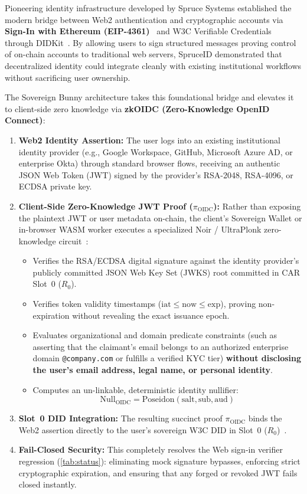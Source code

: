 \documentclass[a4paper,11pt,twoside,parskip=half-,headings=small]{scrartcl}
\newcommand{\code}[1]{\texttt{#1}}
\begin{document}
Pioneering identity infrastructure developed by Spruce Systems established the modern bridge between Web2 authentication and cryptographic accounts via \textbf{Sign-In with Ethereum (EIP-4361)}~\cite{spruceid2022siwe} and W3C Verifiable Credentials through DIDKit~\cite{dif2021did}. By allowing users to sign structured messages proving control of on-chain accounts to traditional web servers, SpruceID demonstrated that decentralized identity could integrate cleanly with existing institutional workflows without sacrificing user ownership.

The Sovereign Bunny architecture takes this foundational bridge and elevates it to client-side zero knowledge via \textbf{zkOIDC (Zero-Knowledge OpenID Connect)}:
\begin{enumerate}
  \item \textbf{Web2 Identity Assertion:} The user logs into an existing institutional identity provider (e.g., Google Workspace, GitHub, Microsoft Azure AD, or enterprise Okta) through standard browser flows, receiving an authentic JSON Web Token (JWT) signed by the provider's RSA-2048, RSA-4096, or ECDSA private key.
  \item \textbf{Client-Side Zero-Knowledge JWT Proof ($\pi_{\text{OIDC}}$):} Rather than exposing the plaintext JWT or user metadata on-chain, the client's Sovereign Wallet or in-browser WASM worker executes a specialized Noir / UltraPlonk zero-knowledge circuit~\cite{aztec2021noir,gabizon2019plonk}:
  \begin{itemize}
    \item Verifies the RSA/ECDSA digital signature against the identity provider's publicly committed JSON Web Key Set (JWKS) root committed in CAR Slot~0 ($R_0$).
    \item Verifies token validity timestamps ($\text{iat} \le \text{now} \le \text{exp}$), proving non-expiration without revealing the exact issuance epoch.
    \item Evaluates organizational and domain predicate constraints (such as asserting that the claimant's email belongs to an authorized enterprise domain \code{@company.com} or fulfills a verified KYC tier) \textbf{without disclosing the user's email address, legal name, or personal identity}.
    \item Computes an un-linkable, deterministic identity nullifier:
    \begin{equation}
      \text{Null}_{\text{OIDC}} = \text{Poseidon}(\text{salt}, \text{sub}, \text{aud})
    \end{equation}
  \end{itemize}
  \item \textbf{Slot~0 DID Integration:} The resulting succinct proof $\pi_{\text{OIDC}}$ binds the Web2 assertion directly to the user's sovereign W3C DID in Slot~0 ($R_0$)~\cite{w3cdid2022}.
  \item \textbf{Fail-Closed Security:} This completely resolves the Web sign-in verifier regression (\cref{tab:status}): eliminating mock signature bypasses, enforcing strict cryptographic expiration, and ensuring that any forged or revoked JWT fails closed instantly.
\end{enumerate}
\end{document}
